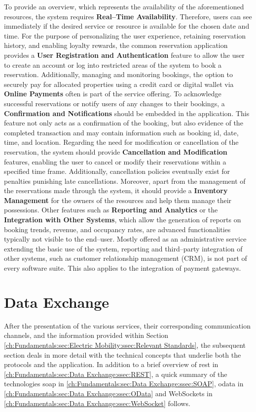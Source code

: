 To provide an overview, which represents the availability of the aforementioned resources, the system requires \textbf{Real--Time Availability}. Therefore, users can see immediately if the desired service or resource is available for the chosen date and time.
For the purpose of personalizing the user experience, retaining reservation history, and enabling loyalty rewards, the common reservation application provides a \textbf{User Registration and Authentication} feature to allow the user to create an account or log into restricted areas of the system to book a reservation.
Additionally, managing and monitoring bookings, the option to securely pay for allocated properties using a credit card or digital wallet via \textbf{Online Payments} often is part of the service offering.
To acknowledge successful reservations or notify users of any changes to their bookings, a \textbf{Confirmation and Notifications} should be embedded in the application. This feature not only acts as a confirmation of the booking, but also evidence of the completed transaction and may contain information such as booking \acrshort{id}, date, time, and location.
Regarding the need for modification or cancellation of the reservation, the system should provide \textbf{Cancellation and Modification} features, enabling the user to cancel or modify their reservations within a specified time frame. Additionally, cancellation policies eventually exist for penalties punishing late cancellations.
Moreover, apart from the management of the reservations made through the system, it should provide a \textbf{Inventory Management} for the owners of the resources and help them manage their possessions.
Other features such as \textbf{Reporting and Analytics} or the \textbf{Integration with Other Systems}, which allow the generation of reports on booking trends, revenue, and occupancy rates, are advanced functionalities typically not visible to the end--user. Mostly offered as an administrative service extending the basic use of the system, reporting and third--party integration of other systems, such as customer relationship management (CRM), is not part of every software suite. 
This also applies to the integration of payment gateways.

\section{Data Exchange}
\label{ch:Fundamentals:sec:Data Exchange}

After the presentation of the various services, their corresponding communication channels, and the information provided within Section \ref{ch:Fundamentals:sec:Electric Mobility:ssec:Relevant Standards}, the subsequent section deals in more detail with the technical concepts that underlie both the protocols and the application.
In addition to a brief overview of \acrfull{rest} in \ref{ch:Fundamentals:sec:Data Exchange:ssec:REST}, a quick summary of the technologies \acrfull{soap} in \ref{ch:Fundamentals:sec:Data Exchange:ssec:SOAP}, \acrfull{odata} in \ref{ch:Fundamentals:sec:Data Exchange:ssec:OData} and WebSockets in \ref{ch:Fundamentals:sec:Data Exchange:ssec:WebSocket} follows. 


